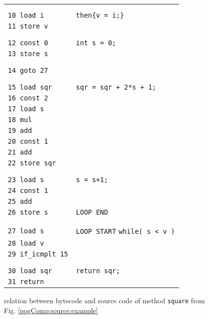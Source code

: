 \begin{figure}[ht!]
\begin{frameit}
{\begin{tabular}{ll}
                           & \\ & \\
\lstinline!10 load i!	   &\Myspace \lstinline!then{v = i;}! \\ 
\lstinline!11 store v!	   & \\  
                           & \\ & \\
\lstinline!12 const 0!	   & \lstinline!int s = 0;! \\
\lstinline!13 store s!	   & \\ 
                           & \\ & \\
\lstinline!14 goto 27!	   & \\ 
	                   & \\ & \\
\lstinline!15 load sqr!      &\Myspace \lstinline!sqr = sqr + 2*s + 1;! \\ 
\lstinline!16 const 2!	   & \\ 
\lstinline!17 load s!	   & \\ 
\lstinline!18 mul!	   & \\        
\lstinline!19 add!	   & \\ 
\lstinline!20 const 1!	   & \\ 
\lstinline!21 add!	   & \\ 
\lstinline!22 store sqr!   & \\ 
                           & \\ & \\

\lstinline!23 load s!      & \Myspace \lstinline!s = s+1;! \\
\lstinline!24 const 1!	   & \\ 
\lstinline!25 add!	   & \\ 
\lstinline!26 store s!	   & \lstinline!LOOP END! \\ 
                           & \\  & \\ 

\lstinline!27 load s!      & \lstinline!LOOP START!  \lstinline!while( s < v )!\\ 
\lstinline!28 load v!      & \\  
\lstinline!29 if_icmplt 15!& \\  
                           & \\  & \\ 
\lstinline!30 load sqr!      &\lstinline!return sqr;!\\ 
\lstinline!31 return!      &\\
  \end{tabular}

}

  \caption{\sc  relation between bytecode and source code of method \lstinline!square! from Fig. \ref{pogComp:source:example} }
  \label{pogEquiv:compile:prop}
\end{frameit}  
\end{figure}
